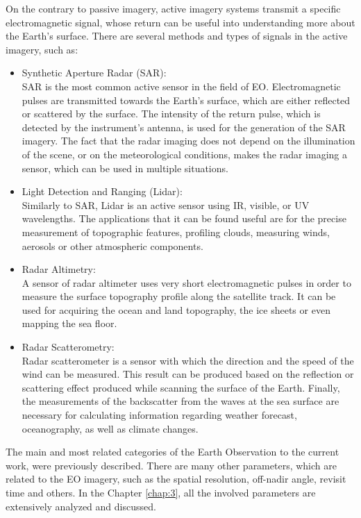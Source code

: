 On the contrary to passive imagery, active imagery systems transmit a specific electromagnetic signal, whose return can be useful into understanding more about the Earth's surface. There are several methods and types of signals in the active imagery, such as:
\begin{itemize}
\item Synthetic Aperture Radar (SAR): \\
SAR is the most common active sensor in the field of EO. Electromagnetic pulses are transmitted towards the Earth's surface, which are either reflected or scattered by the surface. The intensity of the return pulse, which is detected by the instrument's antenna, is used for the generation of the SAR imagery. The fact that the radar imaging does not depend on the illumination of the scene, or on the meteorological conditions, makes the radar imaging a sensor, which can be used in multiple situations.
\item Light Detection and Ranging (Lidar): \\
Similarly to SAR, Lidar is an active sensor using IR, visible, or UV wavelengths. The applications that it can be found useful are for the precise measurement of topographic features, profiling clouds, measuring winds, aerosols or other atmospheric components.
\item Radar Altimetry: \\
A sensor of radar altimeter uses very short electromagnetic pulses in order to measure the surface topography profile along the satellite track. It can be used for acquiring the ocean and land topography, the ice sheets or even mapping the sea floor.
\item Radar Scatterometry: \\
Radar scatterometer is a sensor with which the direction and the speed of the wind can be measured. This result can be produced based on the reflection or scattering effect produced while scanning the surface of the Earth. Finally, the measurements of the backscatter from the waves at the sea surface are necessary for calculating information regarding weather forecast, oceanography, as well as climate changes.
\end{itemize}


\bigskip
The main and most related categories of the Earth Observation to the current work, were previously described. There are many other parameters, which are related to the EO imagery, such as the spatial resolution, off-nadir angle, revisit time and others. In the Chapter \ref{chap:3}, all the involved parameters are extensively analyzed and discussed. 


